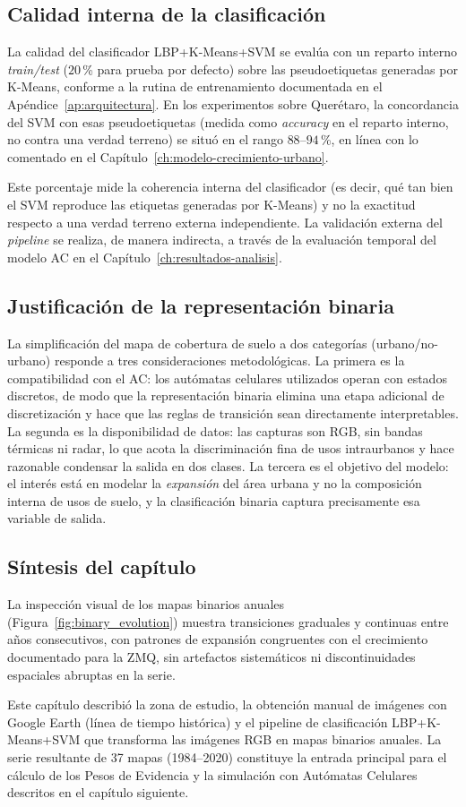 \subsection{Calidad interna de la clasificación}

La calidad del clasificador LBP+K-Means+SVM se evalúa con un reparto interno \textit{train/test} ($20$\,\% para prueba por defecto) sobre las pseudoetiquetas generadas por K-Means, conforme a la rutina de entrenamiento documentada en el Apéndice~\ref{ap:arquitectura}. En los experimentos sobre Querétaro, la concordancia del SVM con esas pseudoetiquetas (medida como \textit{accuracy} en el reparto interno, no contra una verdad terreno) se situó en el rango $88$--$94$\,\%, en línea con lo comentado en el Capítulo~\ref{ch:modelo-crecimiento-urbano}.

Este porcentaje mide la coherencia interna del clasificador (es decir, qué tan bien el SVM reproduce las etiquetas generadas por K-Means) y no la exactitud respecto a una verdad terreno externa independiente. La validación externa del \textit{pipeline} se realiza, de manera indirecta, a través de la evaluación temporal del modelo AC en el Capítulo~\ref{ch:resultados-analisis}.

\subsection{Justificación de la representación binaria}

La simplificación del mapa de cobertura de suelo a dos categorías (urbano/no-urbano) responde a tres consideraciones metodológicas. La primera es la compatibilidad con el AC: los autómatas celulares utilizados operan con estados discretos, de modo que la representación binaria elimina una etapa adicional de discretización y hace que las reglas de transición sean directamente interpretables. La segunda es la disponibilidad de datos: las capturas son RGB, sin bandas térmicas ni radar, lo que acota la discriminación fina de usos intraurbanos y hace razonable condensar la salida en dos clases. La tercera es el objetivo del modelo: el interés está en modelar la \textit{expansión} del área urbana y no la composición interna de usos de suelo, y la clasificación binaria captura precisamente esa variable de salida.

\subsection{Síntesis del capítulo}

La inspección visual de los mapas binarios anuales (Figura~\ref{fig:binary_evolution}) muestra transiciones graduales y continuas entre años consecutivos, con patrones de expansión congruentes con el crecimiento documentado para la ZMQ, sin artefactos sistemáticos ni discontinuidades espaciales abruptas en la serie.

Este capítulo describió la zona de estudio, la obtención manual de imágenes con Google Earth (línea de tiempo histórica) y el pipeline de clasificación LBP+K-Means+SVM que transforma las imágenes RGB en mapas binarios anuales. La serie resultante de 37 mapas (1984--2020) constituye la entrada principal para el cálculo de los Pesos de Evidencia y la simulación con Autómatas Celulares descritos en el capítulo siguiente.
